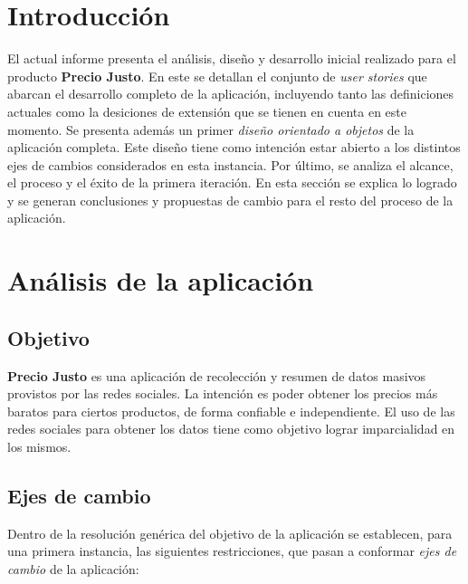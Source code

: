 \documentclass[10pt, a4paper]{article}
\begin{document}
\maketitle
\tableofcontents
\newpage

\section{Introducción}

El actual informe presenta el análisis, diseño y desarrollo inicial realizado para el producto \textbf{Precio Justo}. En este se detallan el conjunto de \emph{user stories} que abarcan el desarrollo completo de la aplicación, incluyendo tanto las definiciones actuales como la desiciones de extensión que se tienen en cuenta en este momento. Se presenta además un primer \emph{diseño orientado a objetos} de la aplicación completa. Este diseño tiene como intención estar abierto a los distintos ejes de cambios considerados en esta instancia. Por último, se analiza el alcance, el proceso y el éxito de la primera iteración. En esta sección se explica lo logrado y se generan conclusiones y propuestas de cambio para el resto del proceso de la aplicación.

\section{Análisis de la aplicación}

\subsection{Objetivo}

\textbf{Precio Justo} es una aplicación de recolección y resumen de datos masivos provistos por las redes sociales. La intención es poder obtener los precios más baratos para ciertos productos, de forma confiable e independiente. El uso de las redes sociales para obtener los datos tiene como objetivo lograr imparcialidad en los mismos.

\subsection{Ejes de cambio}

Dentro de la resolución genérica del objetivo de la aplicación se establecen, para una primera instancia, las siguientes restricciones, que pasan a conformar \emph{ejes de cambio} de la aplicación:
\end{document}
